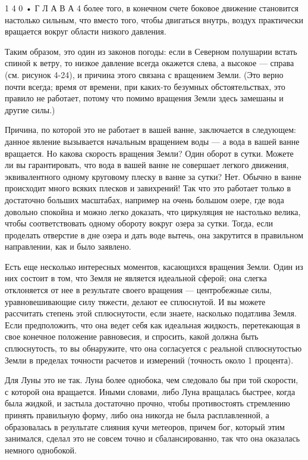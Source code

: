 \documentclass[10pt,oneside]{article}
\begin{document}
1 4 0 • Г Л А В А  4 более того, в конечном счете боковое движение становится настолько сильным, что вместо того, чтобы двигаться внутрь, воздух практически вращается вокруг области низкого давления.\par

Таким образом, это один из законов погоды: если в Северном полушарии встать спиной к ветру, то низкое давление всегда окажется слева, а высокое --- справа (см. рисунок 4-24), и причина этого связана с вращением Земли. (Это верно почти всегда; время от времени, при каких-то безумных обстоятельствах, это правило не работает, потому что помимо вращения Земли здесь замешаны и другие силы.)\par

Причина, по которой это не работает в вашей ванне, заключается в следующем: данное явление вызывается начальным вращением воды --- а вода в вашей ванне вращается. Но какова скорость вращения Земли? Один оборот в сутки. Можете ли вы гарантировать, что вода в вашей ванне не совершает легкого движения, эквивалентного одному круговому плеску в ванне за сутки? Нет. Обычно в ванне происходит много всяких плесков и завихрений! Так что это работает только в достаточно больших масштабах, например на очень большом озере, где вода довольно спокойна и можно легко доказать, что циркуляция не настолько велика, чтобы соответствовать одному обороту вокруг озера за сутки. Тогда, если проделать отверстие в дне озера и дать воде вытечь, она закрутится в правильном направлении, как и было заявлено.\par

Есть еще несколько интересных моментов, касающихся вращения Земли. Один из них состоит в том, что Земля не является идеальной сферой; она слегка отклоняется от нее в результате своего вращения --- центробежные силы, уравновешивающие силу тяжести, делают ее сплюснутой. И вы можете рассчитать степень этой сплюснутости, если знаете, насколько податлива Земля. Если предположить, что она ведет себя как идеальная жидкость, перетекающая в свое конечное положение равновесия, и спросить, какой должна быть сплюснутость, то вы обнаружите, что она согласуется с реальной сплюснутостью Земли в пределах точности расчетов и измерений (точность около 1 процента).\par

Для Луны это не так. Луна более однобока, чем следовало бы при той скорости, с которой она вращается. Иными словами, либо Луна вращалась быстрее, когда была жидкой, и застыла достаточно прочно, чтобы противостоять стремлению принять правильную форму, либо она никогда не была расплавленной, а образовалась в результате слияния кучи метеоров, причем бог, который этим занимался, сделал это не совсем точно и сбалансированно, так что она оказалась немного однобокой.\par
\end{document}
